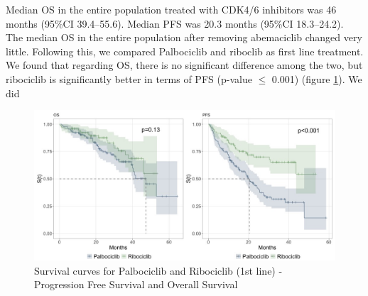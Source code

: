  Median OS in the entire population treated with  CDK4/6 inhibitors was 46 months (95\%CI 39.4–55.6). Median PFS  was 20.3 months (95\%CI 18.3–24.2). The median OS in the entire population after removing abemaciclib changed very little.
Following this, we compared Palbociclib and riboclib as first line treatment. We found that regarding OS, there is no significant difference among the two, but ribociclib is significantly better in terms of PFS (p-value $\le$ 0.001) (figure \ref*{fig:interest}).
We did 


\begin{figure}[ht]
  \caption{Survival curves for Palbociclib and Ribociclib (1st line) - Progression Free Survival and Overall Survival}\label{fig:interest} 
  \includegraphics[scale=0.4]{figures/interest_curve_both.jpeg}%

\end{figure}


